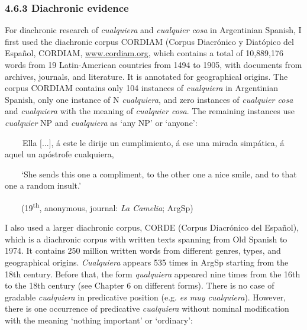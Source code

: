 \subsubsection[4.6.3 Diachronic evidence]{\textbf{4.6.3 Diachronic evidenc}\textbf{e}}
\begin{styleStandard}
For diachronic research of \textit{cualquiera} and \textit{cualquier cosa} in Argentinian Spanish, I first used the diachronic corpus CORDIAM (Corpus Diacrónico y Diatópico del Español, CORDIAM, \href{http://www.cordiam.org}{www.cordiam.org}, which contains a total of 10,889,176 words from 19 Latin-American countries from 1494 to 1905, with documents from archives, journals, and literature. It is annotated for geographical origins. The corpus CORDIAM contains only 104 instances of \textit{cualquiera} in Argentinian Spanish, only one instance of N\textit{ cualquiera}, and zero instances of \textit{cualquier cosa} and \textit{cualquiera} with the meaning of \textit{cualquier cosa}. The remaining instances use \textit{cualquier} NP and \textit{cualquiera} as ‘any NP’ or ‘anyone’: 
\end{styleStandard}

\begin{styleStandard}
\textbf{\ \ }\ \ Ella [...], á este le dirije un cumplimiento, á ese una mirada simpática, á aquel un apóstrofe cualquiera,
\end{styleStandard}

\begin{styleStandard}
\ \ \ \ ‘She sends this one a compliment, to the other one a nice smile, and to that one a random insult.’
\end{styleStandard}

\begin{styleListParagraph}
\textmd{\ \ \ \ (19}\textmd{\textsuperscript{th}}\textmd{, anonymous, journal: }\textmd{\textit{La Camelia}}\textmd{; ArgSp)}
\end{styleListParagraph}

\begin{styleStandard}
I also used a larger diachronic corpus, CORDE (Corpus Diacrónico del Español), which is a diachronic corpus with written texts spanning from Old Spanish to 1974. It contains 250 million written words from different genres, types, and geographical origins. \textit{Cualquiera} appears 535 times in ArgSp starting from the 18th century. Before that, the form \textit{qualquiera} appeared nine times from the 16th to the 18th century (see Chapter 6 on different forms). There is no case of gradable \textit{cualquiera} in predicative position (e.g. \textit{es muy cualquiera}). However, there is one occurrence of predicative \textit{cualquiera} without nominal modification with the meaning ‘nothing important’ or ‘ordinary’: 
\end{styleStandard}

